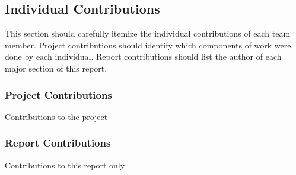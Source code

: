 \subsection{Individual Contributions}

This section should carefully itemize the individual contributions of each team 
member. Project contributions should identify which components of work were done 
by each individual. Report contributions should list the author of each major 
section of this report.

\subsubsection{Project Contributions}

Contributions to the project

\subsubsection{Report Contributions}

Contributions to this report only